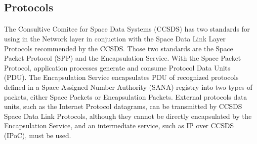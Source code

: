 \subsection{Protocols}
\paragraph{}The Consultive Comitee for Space Data Systems (CCSDS)\cite{CCSDSOverview} has two standards for using in the Network layer in conjuction with the Space Data Link Layer Protocols recommended by the CCSDS. Those two standards are the Space Packet Protocol (SPP)\cite{SPP} and the Encapsulation Service\cite{ES}. With the Space Packet Protocol, application processes generate and consume Protocol Data Units (PDU). The Encapsulation Service encapsulates PDU of recognized protocols defined in a Space Assigned Number Authority (SANA)\cite{SANA} registry into two types of packets, either Space Packets or Encapsulation Packets. External protocols data units, such as the Internet Protocol datagrams, can be transmitted by CCSDS Space Data Link Protocols, although they cannot be directly encapsulated by the Encapsulation Service, and an intermediate service, such as IP over CCSDS (IPoC)\cite{IPoC}, must be used.
